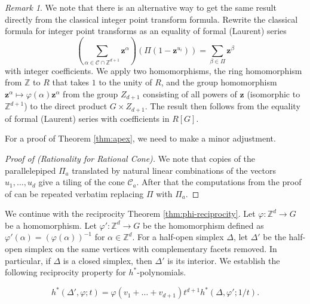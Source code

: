\documentclass[12pt,reqno]{amsart}
\theoremstyle{definition}
\theoremstyle{remark}
\newtheorem{rem}[thm]{Remark}
\newcommand{\Z}{\mathbb{Z}}
\renewcommand{\phi}{\varphi}
\begin{document}
\begin{rem}
We note that there is an alternative way to get the same result directly from the classical integer point transform formula. Rewrite the classical formula for integer point transforms
as an equality of formal (Laurent) series
$$\left(\sum_{\alpha\in \mathcal C\cap \Z^{d+1}}\mathbf z^{\alpha}\right)
\left(\Pi(1-\mathbf z^{u_i})\right)=\sum_{\beta\in\Pi}\mathbf z^\beta$$ with integer 
coefficients. We apply two homomorphisms, the ring homomorphism from $\Z$ to $R$ that takes $1$ to the unity of $R$, and the group homomorphism $\mathbf z^\alpha \mapsto \phi(\alpha)\mathbf z^\alpha$ from the group $Z_{d+1}$ consisting of all powers of $\mathbf z$ (isomorphic to $\Z^{d+1}$) to the direct product $G\times Z_{d+1}$. The result then follows from the equality of formal (Laurent) series with coefficients in $R[G]$.
\end{rem}

For a proof of Theorem \ref{thm:apex}, we need to make a minor adjustment.

\begin{proof}[Proof of  (Rationality for Rational Cone)]
We note that copies of the parallelepiped $\Pi_a$ translated by natural linear combinations of the vectors $u_1,\ldots,u_d$ give a tiling of the cone $\mathcal C_a$. After that the computations from the proof of  can be repeated verbatim replacing $\Pi$ with $\Pi_a$.
\end{proof}



We continue with the reciprocity Theorem \ref{thm:phi-reciprocity}. Let $\phi: \Z^d \to G$ be a homomorphism. Let $\phi': \Z^d \to G$ be the homomorphism defined as $\phi'(\alpha)=(\phi(\alpha))^{-1}$ for $\alpha\in\Z^d$.  For a half-open simplex $\Delta$, let $\Delta'$ be the half-open simplex on the same vertices with complementary facets removed. In particular, if $\Delta$ is a closed simplex, then $\Delta'$ is its interior.
We establish the following reciprocity property for $h^*$-polynomials. 


$$h^*(\Delta',\phi;t)=\phi(v_1+\ldots+v_{d+1})t^{d+1}h^*(\Delta,\phi';1/t).$$
\end{document}
